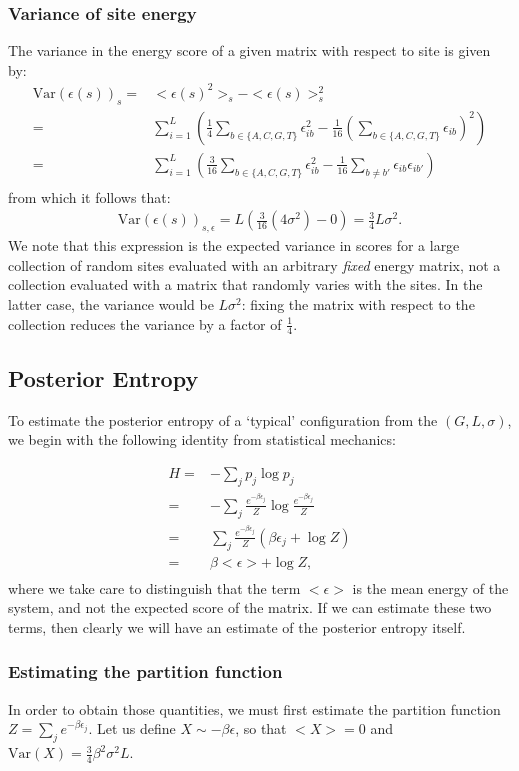 \documentclass{article}
\newcommand{\ep}{\epsilon}
\newcommand{\Var}{\mathrm{Var}}
\begin{document}
\subsubsection{Variance of site energy}
The variance in the energy score of a given matrix with respect to
site is given by:
\begin{align*}
  \Var(\ep(s))_s =& <\ep(s)^2>_s - <\ep(s)>_s^2\\
  =& \sum_{i=1}^L(\frac{1}{4}\sum_{b\in\{A,C,G,T\}}\ep_{ib}^2 - \frac{1}{16}(\sum_{b\in\{A,C,G,T\}}\ep_{ib})^2)\\
  =& \sum_{i=1}^L(\frac{3}{16}\sum_{b\in\{A,C,G,T\}}\ep_{ib}^2 - \frac{1}{16}\sum_{b\neq b'}\ep_{ib}\ep_{ib'})\\
\end{align*}
from which it follows that:
\begin{align*}
  \Var(\ep(s))_{s,\ep} = L(\frac{3}{16}(4\sigma^2) - 0) = \frac{3}{4}L\sigma^2.
\end{align*}
We note that this expression is the expected variance in scores for a
large collection of random sites evaluated with an arbitrary
\textit{fixed} energy matrix, not a collection evaluated with a matrix
that randomly varies with the sites.  In the latter case, the variance
would be $L\sigma^2$: fixing the matrix with respect to the collection
reduces the variance by a factor of $\frac{1}{4}$.

\subsection{Posterior Entropy}
To estimate the posterior entropy of a `typical' configuration from the $(G,L,\sigma)$, we begin with the following identity from statistical mechanics:

\begin{align*}
  H =& -\sum_j p_j\log p_j\\
  =& -\sum_j \frac{e^{-\beta\ep_j}}{Z}\log \frac{e^{-\beta\ep_j}}{Z}\\
  =& \sum_j \frac{e^{-\beta\ep_j}}{Z}(\beta\ep_j + \log Z)\\
  =& \beta<\ep> + \log Z,\\
\end{align*}
where we take care to distinguish that the term $<\epsilon>$ is the
mean energy of the system, and not the expected score of the matrix.
If we can estimate these two terms, then clearly we will have an
estimate of the posterior entropy itself.

\subsubsection{Estimating the partition function}
In order to obtain those quantities, we must first estimate the
partition function $Z = \sum_je^{-\beta\ep_j}$.  Let us define
$X\sim-\beta\ep$, so that $<X>=0$ and
$\Var(X)=\frac{3}{4}\beta^2\sigma^2L$.  
\end{document}
